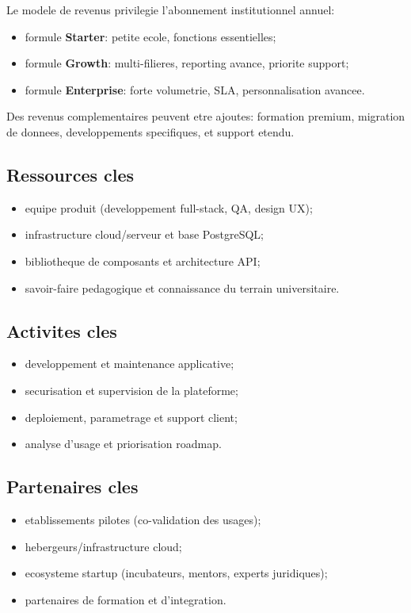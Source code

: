 ﻿\documentclass[12pt,a4paper,oneside]{report}
\begin{document}
Le modele de revenus privilegie l'abonnement institutionnel annuel:
\begin{itemize}
  \item formule \textbf{Starter}: petite ecole, fonctions essentielles;
  \item formule \textbf{Growth}: multi-filieres, reporting avance, priorite support;
  \item formule \textbf{Enterprise}: forte volumetrie, SLA, personnalisation avancee.
\end{itemize}

Des revenus complementaires peuvent etre ajoutes: formation premium, migration de donnees, developpements specifiques, et support etendu.

\subsection{Ressources cles}

\begin{itemize}
  \item equipe produit (developpement full-stack, QA, design UX);
  \item infrastructure cloud/serveur et base PostgreSQL;
  \item bibliotheque de composants et architecture API;
  \item savoir-faire pedagogique et connaissance du terrain universitaire.
\end{itemize}

\subsection{Activites cles}

\begin{itemize}
  \item developpement et maintenance applicative;
  \item securisation et supervision de la plateforme;
  \item deploiement, parametrage et support client;
  \item analyse d'usage et priorisation roadmap.
\end{itemize}

\subsection{Partenaires cles}

\begin{itemize}
  \item etablissements pilotes (co-validation des usages);
  \item hebergeurs/infrastructure cloud;
  \item ecosysteme startup (incubateurs, mentors, experts juridiques);
  \item partenaires de formation et d'integration.
\end{itemize}
\end{document}
